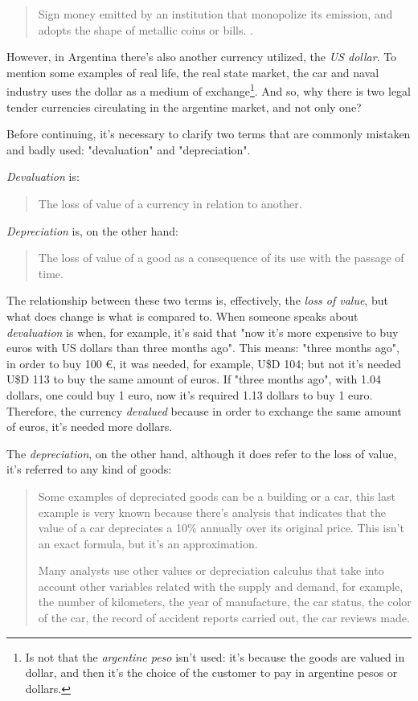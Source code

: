 \documentclass[12pt,a4paper,twoside]{book}
\begin{document}
\begin{quotation}
Sign money emitted by an institution that monopolize its emission, and adopts the shape of metallic coins or bills. \cite[pág. 267]{mochobeker}.
\end{quotation}

However, in Argentina there's also another currency utilized, the \textit{US dollar}. To mention some examples of real life, the real state market, the car and naval industry uses the dollar as a medium of exchange\footnote{Is not that the \textit{argentine peso} isn't used: it's because the goods are valued in dollar, and then it's the choice of the customer to pay in argentine pesos or dollars.}. And so, why there is two legal tender currencies circulating in the argentine market, and not only one?

Before continuing, it's necessary to clarify two terms that are commonly mistaken and badly used: "devaluation" and "depreciation".

\textit{Devaluation} is:

\begin{quote}
The loss of value of a currency in relation to another. \cite{epedia:deval}
\end{quote}

\textit{Depreciation} is, on the other hand:

\begin{quote}
The loss of value of a good as a consequence of its use with the passage of time. \cite{epedia:depr}
\end{quote}

The relationship between these two terms is, effectively, the \textit{loss of value}, but what does change is what is compared to. When someone speaks about \textit{devaluation} is when, for example, it's said that "now it's more expensive to buy euros with US dollars than three months ago". This means: "three months ago", in order to buy 100 €, it was needed, for example, U\$D 104; but not it's needed U\$D 113 to buy the same amount of euros. If "three months ago", with 1.04 dollars, one could buy 1 euro, now it's required 1.13 dollars to buy 1 euro. Therefore, the currency \textit{devalued} because in order to exchange the same amount of euros, it's needed more dollars.

The \textit{depreciation}, on the other hand, although it does refer to the loss of value, it's referred to any kind of goods:

\begin{quotation}
Some examples of depreciated goods can be a building or a car, this last example is very known because there's analysis that indicates that the value of a car depreciates a 10\% annually over its original price. This isn't an exact formula, but it's an approximation.

Many analysts use other values or depreciation calculus that take into account other variables related with the supply and demand, for example, the number of kilometers, the year of manufacture, the car status, the color of the car, the record of accident reports carried out, the car reviews made. \cite{epedia:depr}
\end{quotation}
\end{document}
